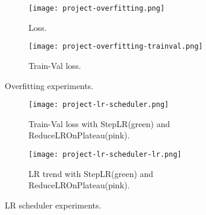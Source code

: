 \begin{table}
    \centering
    \caption{Comparison complexity between models.}\label{project:model-overfitting-complexity}
\end{table}

\begin{figure}[H]
    \begin{subfigure}{\textwidth}
        \centering
        \texttt{[image: project-overfitting.png]}
        \caption{Loss.}        
    \end{subfigure}
    \begin{subfigure}{\textwidth}
        \centering
        \texttt{[image: project-overfitting-trainval.png]}
        \caption{Train-Val loss.}
    \end{subfigure}    
        \caption{Overfitting experiments.}\label{project:overfitting-experiments}           
\end{figure}

\begin{figure}[H]
    \begin{subfigure}{\textwidth}
        \centering
        \texttt{[image: project-lr-scheduler.png]}
        \caption{Train-Val loss with StepLR(green) and ReduceLROnPlateau(pink).}
    \end{subfigure}
    \begin{subfigure}{\textwidth}
        \centering
        \texttt{[image: project-lr-scheduler-lr.png]}
        \caption{LR trend with StepLR(green) and ReduceLROnPlateau(pink).}
    \end{subfigure}
    \caption{LR scheduler experiments.}\label{project:lr-scheduler-experiments}
\end{figure}

